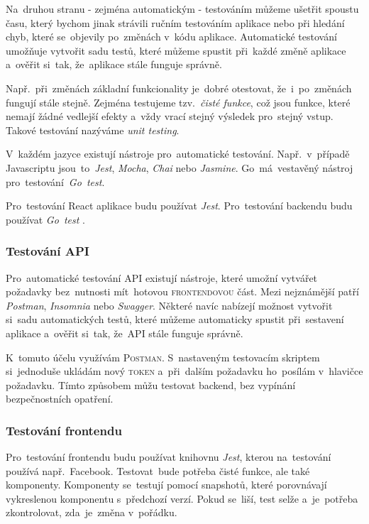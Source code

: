 \documentclass[14pt,a4paper]{article}
\begin{document}
        Na~druhou stranu - zejména automatickým - testováním můžeme ušetřit spoustu času, který bychom jinak strávili ručním testováním aplikace nebo při hledání chyb, které se~objevily po~změnách v~kódu aplikace. Automatické testování umožňuje vytvořit sadu testů, které můžeme spustit při~každé změně aplikace a~ověřit si~tak, že~aplikace stále funguje správně.
        
        Např.~při~změnách základní funkcionality je~dobré otestovat, že~i~po~změnách fungují stále stejně. Zejména testujeme tzv.~\emph{čisté funkce}, což jsou funkce, které nemají žádné vedlejší efekty a~vždy vrací stejný výsledek pro~stejný vstup. Takové testování nazýváme \emph{unit testing}.
        
        V~každém jazyce existují nástroje pro~automatické testování. Např.~v~případě Javascriptu jsou~to~\emph{Jest}, \emph{Mocha}, \emph{Chai} nebo \emph{Jasmine}. Go~má~vestavěný nástroj pro~testování~\emph{Go~test}.
        
        Pro~testování React aplikace budu používat \emph{Jest}. Pro~testování backendu budu používat \emph{Go~test} \cite{jestjsTestingReact}.
        
        \subsubsection{Testování API}
        Pro~automatické testování API existují nástroje, které umožní vytvářet požadavky bez~nutnosti mít~hotovou \textsc{frontendovou} část. Mezi nejznámější patří \emph{Postman}, \emph{Insomnia} nebo \emph{Swagger}. Některé navíc nabízejí možnost vytvořit si~sadu automatických testů, které můžeme automaticky spustit při~sestavení aplikace a~ověřit si~tak, že~API stále funguje správně.

        K~tomuto účelu využívám \textsc{Postman}. S~nastaveným testovacím skriptem si~jednoduše ukládám nový \textsc{token} a~při~dalším požadavku ho~posílám v~hlavičce požadavku. Tímto způsobem můžu testovat backend, bez vypínání bezpečnostních opatření.

        \subsubsection{Testování frontendu}
        Pro~testování frontendu budu používat knihovnu \emph{Jest}, kterou na~testování používá např.~Facebook. Testovat~bude potřeba čisté funkce, ale také komponenty. Komponenty se~testují pomocí snapshotů, které porovnávají vykreslenou komponentu s~předchozí verzí. Pokud se~liší, test selže a~je~potřeba zkontrolovat, zda~je~změna v~pořádku. \cite{jestjsTestingReact}
\end{document}
